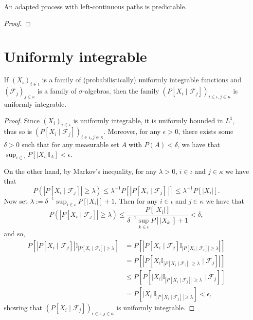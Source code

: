 \begin{lemma}\label{lem:Adapted.isPredictable_of_leftContinuous}
An adapted process with left-continuous paths is predictable.
\end{lemma}

\begin{proof}

\end{proof}



\section{Uniformly integrable}

\begin{lemma}\label{lem:condExpUI}
  \leanok
  If $(X_i)_{i \in \iota}$ is a family of (probabilistically) uniformly integrable functions and $(\mathcal{F}_j)_{j \in \kappa}$ is a family of $\sigma$-algebras,
  then the family $(P[X_i \mid \mathcal{F}_j])_{i \in \iota, j \in \kappa}$ is uniformly integrable.
\end{lemma}

\begin{proof}\leanok
  Since $(X_i)_{i \in \iota}$ is uniformly integrable, it is uniformly bounded in $L^1$, thus so is $(P[X_i \mid \mathcal{F}_j])_{i \in \iota, j \in \kappa}$. Moreover, for any \(\epsilon > 0\),
  there exists some \(\delta > 0\) such that
  for any measurable set \(A\) with \(P(A) < \delta\), we have that \(\sup_{i \in \iota} P[|X_i| \mathbb{I}_A] < \epsilon\).

  On the other hand, by Markov's inequality, for any $\lambda > 0$, $i \in \iota$ and $j \in \kappa$ we have that
  \[P(|P[X_i \mid \mathcal{F}_j]| \ge \lambda) \le \lambda^{-1}P[|P[X_i \mid \mathcal{F}_j]|] \le \lambda^{-1}P[|X_i|].\]
  Now set \(\lambda := \delta^{-1} \sup_{i \in \iota} P[|X_i|] + 1\). Then for any $i \in \iota$ and $j \in \kappa$ we have that
  \[P(|P[X_i \mid \mathcal{F}_j]| \ge \lambda) \le \frac{P[|X_i|]}{\delta^{-1} \sup_{k \in \iota} P[|X_k|] + 1} < \delta,\]
  and so,
  \begin{align*}
    P[|P[X_i \mid \mathcal{F}_j]| \mathbb{I}_{|P[X_i \mid \mathcal{F}_i]| \ge \lambda}]
    & = P[|P[X_i \mid \mathcal{F}_j] \mathbb{I}_{|P[X_i \mid \mathcal{F}_i]| \ge \lambda}|] \\
    & = P[|P[X_i \mathbb{I}_{|P[X_i \mid \mathcal{F}_i]| \ge \lambda} \mid \mathcal{F}_j]|] \\
    & \le P[P[|X_i|\mathbb{I}_{|P[X_i \mid \mathcal{F}_j]| \ge \lambda} \mid \mathcal{F}_j]] \\
    & = P[|X_i|\mathbb{I}_{|P[X_i \mid \mathcal{F}_j]| \ge \lambda}] < \epsilon,
  \end{align*}
  showing that \((P[X_i \mid \mathcal{F}_j])_{i \in \iota, j \in \kappa}\) is uniformly integrable.
\end{proof}


